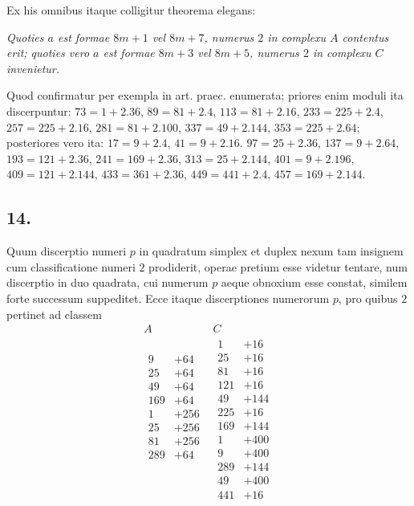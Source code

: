 \documentclass[twoside,12pt]{memoir}
\begin{document}
Ex his omnibus itaque colligitur theorema elegans:
 
\textit{Quoties \(a\) est formae \(8 m+1\) vel \(8 m+7\), numerus \(2\) in complexu \(A\) contentus erit; quoties vero \(a\) est formae \(8 m+3\) vel \(8 m+5\), numerus \(2\) in complexu \(C\) invenietur.}
 
Quod confirmatur per exempla in art. praec. enumerata; priores enim moduli ita discerpuntur: \(73=1+2.36\), \(89=81+2.4\), \(113=81+2.16\), \(233=225+2.4\), \(257=225+2.16\), \(281=81+2.100\), \(337=49+2.144\), \(353=225+2.64\); posteriores vero ita: \(17=9+2.4\), \(41=9+2.16\). \(97=25+2.36\), \(137=9+2.64\), \(193=121+2.36\), \(241=169+2.36\), \(313=25+2.144\), \(401=9+2.196\), \(409=121+2.144\), \(433=361+2.36\), \(449=441+2.4\), \(457=169+2.144\).

\subsection*{14.}
 
Quum discerptio numeri \(p\) in quadratum simplex et duplex nexum tam insignem cum classificatione numeri \(2\) prodiderit, operae pretium esse videtur tentare, num discerptio in duo quadrata, cui numerum \(p\) aeque obnoxium esse constat, similem forte successum suppeditet. Ecce itaque discerptiones numerorum \(p\), pro quibus \(2\) pertinet ad classem
\[\begin{array}{c|c}
A & C  \\[2pt]
\hline 
\begin{aligned}
9&+64  \\
25&+64  \\
49&+64 \\
169&+64\\
1&+256 \\
25&+256\\
81&+256\\
289&+64\\
\\
\\
\\
\\
 \end{aligned}
&
\begin{aligned}
 1&+16\\
 25&+16\\
 81&+16\\
 121&+16\\
 49&+144\\
225&+16\\
 169&+144\\
 1&+400\\
9&+400\\
289&+144\\
49&+400\\
441&+16 
\end{aligned}
\end{array}\]\pagebreak%
\end{document}
